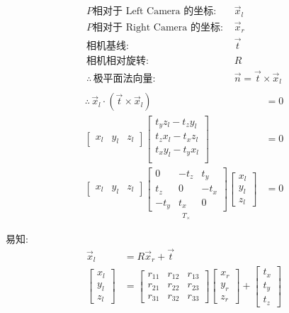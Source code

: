 \begin{align*}
    \text{$P$相对于 Left Camera 的坐标: }&\vec{x}_l\\
    \text{$P$相对于 Right Camera 的坐标: }&\vec{x}_r\\
    \text{相机基线: }&\vec{t}\\
    \text{相机相对旋转: }&R\\
    \therefore \,  \text{极平面法向量: }&\vec{n}=\vec{t}\times \vec{x}_l\\
\end{align*}
\begin{align*}
    \therefore \,  \vec{x}_l \cdot (\vec{t}\times \vec{x}_l)&=0\\
    \begin{bmatrix}
        x_l&y_l&z_l
    \end{bmatrix}\begin{bmatrix}
        t_y z_l-t_z y_l\\
        t_z x_l-t_x z_l\\
        t_x y_l-t_y x_l\\
    \end{bmatrix}&=0\\
    \begin{bmatrix}
        x_l&y_l&z_l
    \end{bmatrix}
    \underset{T_{\times}}{\begin{bmatrix}
        0&-t_z&t_y\\
        t_z&0&-t_x\\
        -t_y&t_x&0
    \end{bmatrix}}
    \begin{bmatrix}
        x_l\\y_l\\z_l
    \end{bmatrix}
    &=0
\end{align*}

易知: 
\begin{align*}
    \vec{x}_l&=R\vec{x}_r+\vec{t}\\
    \begin{bmatrix}
        x_l\\y_l\\z_l
    \end{bmatrix}&=\begin{bmatrix}
        r_{11} & r_{12} & r_{13}\\
        r_{21} & r_{22} & r_{23}\\
        r_{31} & r_{32} & r_{33}
    \end{bmatrix}\begin{bmatrix}
        x_r\\y_r\\z_r
    \end{bmatrix}+\begin{bmatrix}
        t_x\\t_y\\t_z
    \end{bmatrix}
\end{align*}

